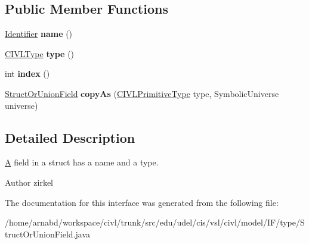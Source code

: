 \subsection*{Public Member Functions}
\begin{DoxyCompactItemize}
\item 
\hypertarget{interfaceedu_1_1udel_1_1cis_1_1vsl_1_1civl_1_1model_1_1IF_1_1type_1_1StructOrUnionField_a4d1cb9a8bbb5b9e73e1eba4c851f7552}{}\hyperlink{interfaceedu_1_1udel_1_1cis_1_1vsl_1_1civl_1_1model_1_1IF_1_1Identifier}{Identifier} {\bfseries name} ()\label{interfaceedu_1_1udel_1_1cis_1_1vsl_1_1civl_1_1model_1_1IF_1_1type_1_1StructOrUnionField_a4d1cb9a8bbb5b9e73e1eba4c851f7552}

\item 
\hypertarget{interfaceedu_1_1udel_1_1cis_1_1vsl_1_1civl_1_1model_1_1IF_1_1type_1_1StructOrUnionField_ac5d783f20a34d9bef6d8d6d36ef7a416}{}\hyperlink{interfaceedu_1_1udel_1_1cis_1_1vsl_1_1civl_1_1model_1_1IF_1_1type_1_1CIVLType}{C\+I\+V\+L\+Type} {\bfseries type} ()\label{interfaceedu_1_1udel_1_1cis_1_1vsl_1_1civl_1_1model_1_1IF_1_1type_1_1StructOrUnionField_ac5d783f20a34d9bef6d8d6d36ef7a416}

\item 
\hypertarget{interfaceedu_1_1udel_1_1cis_1_1vsl_1_1civl_1_1model_1_1IF_1_1type_1_1StructOrUnionField_a15ea4d710df14e2ec4d9170fc3adc448}{}int {\bfseries index} ()\label{interfaceedu_1_1udel_1_1cis_1_1vsl_1_1civl_1_1model_1_1IF_1_1type_1_1StructOrUnionField_a15ea4d710df14e2ec4d9170fc3adc448}

\item 
\hypertarget{interfaceedu_1_1udel_1_1cis_1_1vsl_1_1civl_1_1model_1_1IF_1_1type_1_1StructOrUnionField_a6b481de8e37e2f800dfb885b4b52024a}{}\hyperlink{interfaceedu_1_1udel_1_1cis_1_1vsl_1_1civl_1_1model_1_1IF_1_1type_1_1StructOrUnionField}{Struct\+Or\+Union\+Field} {\bfseries copy\+As} (\hyperlink{interfaceedu_1_1udel_1_1cis_1_1vsl_1_1civl_1_1model_1_1IF_1_1type_1_1CIVLPrimitiveType}{C\+I\+V\+L\+Primitive\+Type} type, Symbolic\+Universe universe)\label{interfaceedu_1_1udel_1_1cis_1_1vsl_1_1civl_1_1model_1_1IF_1_1type_1_1StructOrUnionField_a6b481de8e37e2f800dfb885b4b52024a}

\end{DoxyCompactItemize}


\subsection{Detailed Description}
\hyperlink{structA}{A} field in a struct has a name and a type. 

\begin{DoxyAuthor}{Author}
zirkel 
\end{DoxyAuthor}


The documentation for this interface was generated from the following file\+:\begin{DoxyCompactItemize}
\item 
/home/arnabd/workspace/civl/trunk/src/edu/udel/cis/vsl/civl/model/\+I\+F/type/Struct\+Or\+Union\+Field.\+java\end{DoxyCompactItemize}
